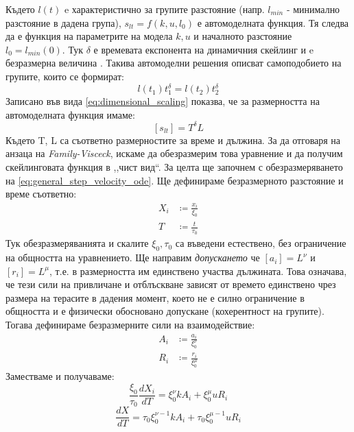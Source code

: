 Където $l(t)$ e характеристично за групите разстояние (напр. $l_{min}$ - минимално разстояние в дадена група),  $s_{l t} = f(k, u, l_0)$ е автомоделната функция. Тя следва да е функция на параметрите на модела $k, u$ и началното разстояние $l_0 = l_{min} (0)$. Тук $\delta$ е времевата експонента на динамичния скейлинг и e безразмерна величина \cite{Vicsek1984}. Такива автомоделни решения описват самоподобието на групите, които се формират:
\begin{equation*}
    l(t_1) t_1^\delta = l(t_2) t_2^\delta
\end{equation*}
Записано във вида \autoref{eq:dimensional_scaling} показва, че за размерността на автомоделната функция имаме:
\begin{equation*}
    \left[s_{l t} \right] = T^\delta L
\end{equation*}
Където T, L са съответно размерностите за време и дължина. За да отговаря на анзаца на \textit{Family-Visceck}, искаме да обезразмерим това уравнение и да получим скейлинговата функция в ,,чист вид``. За целта ще започнем с обезразмеряването на \autoref{eq:general_step_velocity_ode}.
Ще дефинираме безразмерното разстояние и време съответно:
\begin{align*}
    X_{i} & \coloneqq \frac{x_i}{\xi_0} \\
    T & \coloneqq \frac{t}{\tau_0}
\end{align*}
Тук обезразмеряванията и скалите $\xi_0, \tau_0$ са въведени естествено, без ограничение на общността на уравнението.
Ще направим \textit{допускането} че $[a_i] = L ^ \nu $ и $[r_i] = L ^ \mu$, т.е. в размерността им единствено участва дължината. Това означава, че тези сили на привличане и отблъскване зависят от времето единствено чрез размера на терасите в дадения момент, което не е силно ограничение в общността и е физически обосновано допускане (кохерентност на групите). Тогава дефинираме безразмерните сили на взаимодействие:
\begin{align*}
    A_{i} & \coloneqq \frac{a_i}{\xi_{0}^ \nu} \\
    R_{i} & \coloneqq \frac{r_i}{\xi_{0}^ \mu}
\end{align*}
Заместваме и получаваме:
\begin{equation*}
    \frac{\xi_0}{\tau_0} \frac{d X_i}{d T} = \xi_0^\nu k A_i + \xi_0^\mu u R_i
\end{equation*}
\begin{equation*}
    \frac{d X }{d T} = \tau_0 \xi_0^{\nu-1} k A_i + \tau_0 \xi_0^{\mu-1} u R_i
\end{equation*}

